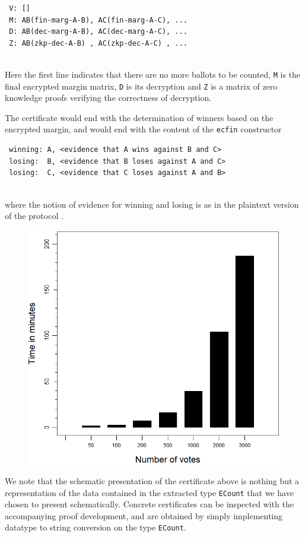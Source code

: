  {\small\begin{verbatim}
 V: []
 M: AB(fin-marg-A-B), AC(fin-marg-A-C), ...
 D: AB(dec-marg-A-B), AC(dec-marg-A-C), ...
 Z: AB(zkp-dec-A-B) , AC(zkp-dec-A-C) , ...
 \end{verbatim}}

 \mbox{}\\[-5ex]
 Here the first line indicates that there are no more ballots to be
 counted, \texttt{M} is the final encrypted margin matrix,
 \texttt{D} is its decryption and \texttt{Z} is a matrix of zero
 knowledge proofs verifying the correctness of decryption.

 The certificate would end with the determination of winners based
 on the encrypted margin, and would end with the content of the
 \texttt{ecfin} constructor

 {\small\begin{verbatim}
 winning: A, <evidence that A wins against B and C>
 losing:  B, <evidence that B loses against A and C>
 losing:  C, <evidence that C loses against A and B>
 \end{verbatim}}

 \mbox{}\\[-5ex]
 where the notion of evidence for winning and losing is as in the
 plaintext version of the protocol \cite{Pattinson:2017:SVE}.

\begin{figure}
\centering
\vspace*{-1cm}
\includegraphics[scale=0.40]{PlotVer3.png}
\vspace*{-1cm}
\end{figure}
 We note that the schematic presentation of the certificate above is
 nothing but a representation of the data contained in the extracted
 type \texttt{ECount} that we have chosen to present schematically.
 Concrete certificates can be inspected with the accompanying proof
 development, and are obtained by simply implementing datatype to
string conversion on the type \texttt{ECount}.\

